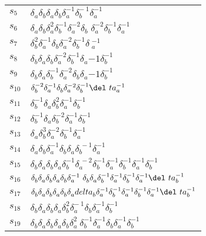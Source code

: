 \documentclass{article}
\begin{document}
\begin{center}
\begin{tabular}{ll}
$s_{5}$ & $\delta_a^{}\delta_b^{}\delta_a^{}\delta_b^{}\delta_a^{-1}\delta_b^{-\
1}\delta_a^{-1}$ \\
$s_{6}$ & $\delta_a^{}\delta_b^{}\delta_a^{2}\delta_b^{-1}\delta_a^{-2}\delta_b\
^{}\delta_a^{-2}\delta_b^{-1}\delta_a^{-1}$ \\
$s_{7}$ & $\delta_b^{2}\delta_a^{-1}\delta_b^{}\delta_a^{-2}\delta_b^{-1}\delta\
_a^{-1}$ \\
$s_{8}$ & $\delta_b^{}\delta_a^{}\delta_b^{}\delta_a^{-2}\delta_b^{-1}\delta_a^\
{-1}\delta_b^{-1}$ \\
$s_{9}$ & $\delta_b^{}\delta_a^{}\delta_b^{-1}\delta_a^{-2}\delta_b^{}\delta_a^\
{-1}\delta_b^{-1}$ \\
$s_{10}$ & $\delta_b^{-2}\delta_a^{-1}\delta_b^{}\delta_a^{-2}\delta_b^{-1}\del\
ta_a^{-1}$ \\
$s_{11}$ & $\delta_b^{-1}\delta_a^{}\delta_b^{2}\delta_a^{-1}\delta_b^{-1}$ \\
$s_{12}$ & $\delta_b^{-1}\delta_a^{}\delta_b^{-2}\delta_a^{-1}\delta_b^{-1}$ \\
$s_{13}$ & $\delta_a^{}\delta_b^{3}\delta_a^{-2}\delta_b^{-1}\delta_a^{-1}$ \\
$s_{14}$ & $\delta_a^{}\delta_b^{}\delta_a^{-1}\delta_b^{}\delta_a^{}\delta_b^{\
-1}\delta_a^{-1}$ \\
$s_{15}$ & $\delta_b^{}\delta_a^{}\delta_b^{}\delta_a^{}\delta_b^{-1}\delta_a^{\
-2}\delta_b^{-1}\delta_a^{-1}\delta_b^{-1}\delta_a^{-1}\delta_b^{-1}$ \\
$s_{16}$ & $\delta_b^{}\delta_a^{}\delta_b^{}\delta_a^{}\delta_b^{}\delta_a^{-1\
}\delta_b^{}\delta_a^{}\delta_b^{-1}\delta_a^{-1}\delta_b^{-1}\delta_a^{-1}\del\
ta_b^{-1}$ \\
$s_{17}$ & $\delta_b^{}\delta_a^{}\delta_b^{}\delta_a^{}\delta_b^{}\delta_a^{}\\
delta_b^{}\delta_a^{-1}\delta_b^{-1}\delta_a^{-1}\delta_b^{-1}\delta_a^{-1}\del\
ta_b^{-1}$ \\
$s_{18}$ & $\delta_b^{}\delta_a^{}\delta_b^{}\delta_a^{}\delta_b^{2}\delta_a^{-\
1}\delta_b^{}\delta_a^{-1}\delta_b^{-1}$ \\
$s_{19}$ & $\delta_b^{}\delta_a^{}\delta_b^{}\delta_a^{}\delta_b^{}\delta_a^{2}\
\delta_b^{-1}\delta_a^{-1}\delta_b^{}\delta_a^{-1}\delta_b^{-1}$ \\
\bottomrule
\end{tabular}
\end{center}

\thispagestyle{empty}
\end{document}
